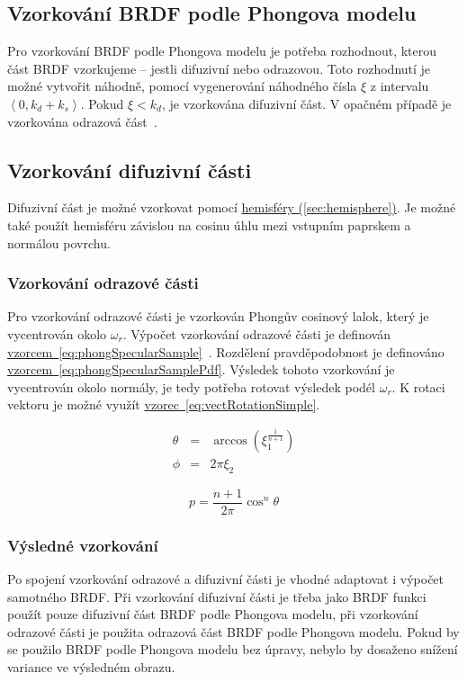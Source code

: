 \documentclass[czech,master]{diploma}
\newcommand{\intervalcc}[2]{\left<{{#1},{#2}}\right>}
\newcommand{\refl}{\omega_{r}}
\newcommand{\randU}{\xi_{1}}
\newcommand{\randV}{\xi_{2}}
\begin{document}
\subsection{Vzorkování BRDF podle Phongova modelu} \label{sec:phongSampling}
Pro vzorkování BRDF podle Phongova modelu je potřeba rozhodnout, kterou část BRDF vzorkujeme -- jestli difuzivní nebo odrazovou. Toto rozhodnutí je možné vytvořit náhodně, pomocí vygenerování náhodného čísla \(\xi\) z intervalu \(\intervalcc{0}{k_d+k_s}\). Pokud \(\xi < k_d\), je vzorkována difuzivní část. V opačném případě je vzorkována odrazová část~\cite{KrivanekBRDFIBL}.
\subsection{Vzorkování difuzivní části}
Difuzivní část je možné vzorkovat pomocí \hyperref[sec:hemisphere]{hemisféry (\ref{sec:hemisphere})}. Je možné také použít hemisféru závislou na cosinu úhlu mezi vstupním paprskem a normálou povrchu.

\subsubsection{Vzorkování odrazové části}
Pro vzorkování odrazové části je vzorkován Phongův cosinový lalok, který je vycentrován okolo \(\refl\). Výpočet vzorkování odrazové části je definován \hyperref[eq:phongSpecularSample]{vzorcem~\ref{eq:phongSpecularSample}}~\cite{KrivanekBRDFIBL}. Rozdělení pravděpodobnost je definováno \hyperref[eq:phongSpecularSamplePdf]{vzorcem~\ref{eq:phongSpecularSamplePdf}}.
Výsledek tohoto vzorkování je vycentrován okolo normály, je tedy potřeba rotovat výsledek podél \(\refl\). K rotaci vektoru je možné využít \hyperref[eq:vectRotationSimple]{vzorec~\ref{eq:vectRotationSimple}}.

\begin{eqnarray}
  \theta & = & \arccos(\randU^{\frac{1}{n+1}}) \nonumber \\
  \phi & = & 2\pi\randV\label{eq:phongSpecularSample}
\end{eqnarray}

\begin{equation} \label{eq:phongSpecularSamplePdf}
  p = \frac{n+1}{2\pi}\cos^n\theta
\end{equation}

\subsubsection{Výsledné vzorkování}
Po spojení vzorkování odrazové a difuzivní části je vhodné adaptovat i výpočet samotného BRDF\@. Při vzorkování difuzivní části je třeba jako BRDF funkci použít pouze difuzivní část BRDF podle Phongova modelu, při vzorkování odrazové části je použita odrazová část BRDF podle Phongova modelu\@. Pokud by se použilo BRDF podle Phongova modelu bez úpravy, nebylo by dosaženo snížení variance ve výsledném obrazu.~\cite{KrivanekBRDFIBL}
\end{document}
